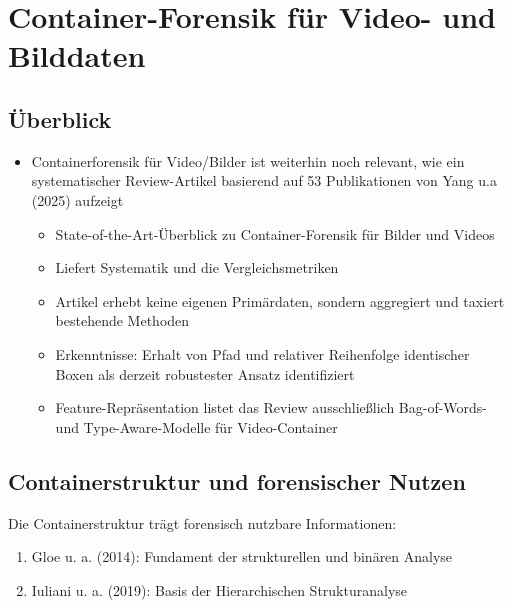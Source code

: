 
\section{Container-Forensik für Video- und Bilddaten}



\subsection{Überblick}

\begin{itemize}
    \item Containerforensik für Video/Bilder ist weiterhin noch relevant, wie ein systematischer Review-Artikel basierend auf 53 Publikationen von Yang u.a (2025) \cite{yang_comprehensive_2025} aufzeigt
    \begin{itemize}
        \item State-of-the-Art-Überblick zu Container-Forensik für Bilder und Videos
        \item Liefert Systematik und die Vergleichsmetriken
        \item Artikel erhebt keine eigenen Primärdaten, sondern aggregiert und taxiert bestehende Methoden
        \item Erkenntnisse: Erhalt von Pfad und relativer Reihenfolge identischer Boxen als derzeit robustester Ansatz identifiziert
        \item Feature-Repräsentation listet das Review ausschließlich Bag-of-Words- und Type-Aware-Modelle für Video-Container  \cite[Kap. 4.3.4]{yang_comprehensive_2025}
    \end{itemize}
\end{itemize}

\subsection{Containerstruktur und forensischer Nutzen}

Die Containerstruktur trägt forensisch nutzbare Informationen:

\begin{enumerate}
    \item Gloe u. a. (2014)\cite{gloe_forensic_2014}: Fundament der strukturellen und binären Analyse
    \item Iuliani u. a. (2019)\cite{iuliani_video_2019}: Basis der Hierarchischen Strukturanalyse\end{enumerate}

